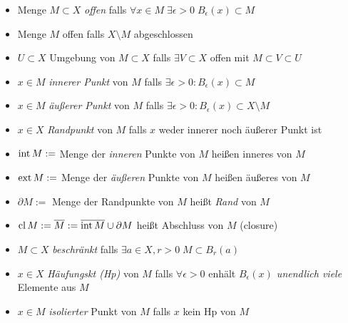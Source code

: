 \begin{mydefn}
    \begin{itemize}
    \item Menge $M\subset X$ \emph{offen} falls $\forall x \in M\;\exists \epsilon > 0\; B_{\epsilon}(x) \subset M$
    \item Menge $M$ offen falls $X\setminus M$ abgeschlossen
    \item $U \subset X$ Umgebung von $M \subset X$ falls $\exists V \subset X$ offen mit $M \subset V \subset U$
    \item $x \in M$ \emph{innerer Punkt} von $M$ falls $\exists \epsilon >0\colon B_{\epsilon}(x) \subset M$
    \item $x \in M$ \emph{äußerer Punkt} von $M$ falls $\exists \epsilon >0\colon B_{\epsilon}(x) \subset X\setminus M$
    \item $x \in X$ \emph{Randpunkt} von $M$ falls $x$ weder innerer noch äußerer Punkt ist
    \item $\operatorname{int} M:=$ Menge der \emph{inneren} Punkte von $M$ heißen inneres von $M$
    \item $\operatorname{ext} M:=$ Menge der \emph{äußeren} Punkte von $M$ heißen äußeres von $M$
    \item $\partial M:=$ Menge der Randpunkte von $M$ heißt \emph{Rand} von $M$
    \item $\operatorname{cl} M:= \overline{M}:=\overline{\operatorname{int} M} \cup \partial M$ heißt Abschluss von $M$ (closure)
    \item $M \subset X$ \emph{beschränkt} falls $\exists a \in X, r >0\; M \subset B_r(a)$
    \item $x \in X$ \emph{Häufungskt (Hp)} von $M$ falls $\forall \epsilon > 0$ enhält \emph{$B_{\epsilon}(x)$ unendlich viele} Elemente aus $M$
    \item $x \in M$ \emph{isolierter} Punkt von $M$ falls $x$ kein Hp von $M$
    \end{itemize}
\end{mydefn}

